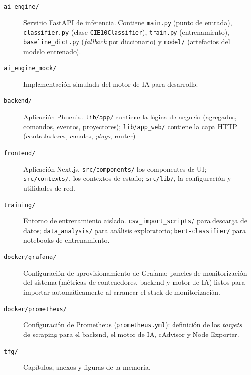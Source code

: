 \begin{description}
 \item[\texttt{ai\_engine/}] Servicio FastAPI de inferencia. Contiene \texttt{main.py} (punto de entrada), \texttt{classifier.py} (clase \texttt{CIE10Classifier}), \texttt{train.py} (entrenamiento), \texttt{baseline\_dict.py} (\emph{fallback} por diccionario) y \texttt{model/} (artefactos del modelo entrenado).
 \item[\texttt{ai\_engine\_mock/}] Implementación simulada del motor de IA para desarrollo.
 \item[\texttt{backend/}] Aplicación Phoenix. \texttt{lib/app/} contiene la lógica de negocio (agregados, comandos, eventos, proyectores); \texttt{lib/app\_web/} contiene la capa HTTP (controladores, canales, \emph{plugs}, router).
 \item[\texttt{frontend/}] Aplicación Next.js. \texttt{src/components/} los componentes de UI; \texttt{src/contexts/}, los contextos de estado; \texttt{src/lib/}, la configuración y utilidades de red.
 \item[\texttt{training/}] Entorno de entrenamiento aislado. \texttt{csv\_import\_scripts/} para descarga de datos; \texttt{data\_analysis/} para análisis exploratorio; \texttt{bert-classifier/} para notebooks de entrenamiento.
 \item[\texttt{docker/grafana/}] Configuración de aprovisionamiento de Grafana: paneles de monitorización del sistema (métricas de contenedores, backend y motor de IA) listos para importar automáticamente al arrancar el stack de monitorización.
 \item[\texttt{docker/prometheus/}] Configuración de Prometheus (\texttt{prometheus.yml}): definición de los \emph{targets} de scraping para el backend, el motor de IA, cAdvisor y Node Exporter.
 \item[\texttt{tfg/}] Capítulos, anexos y figuras de la memoria.
\end{description}
